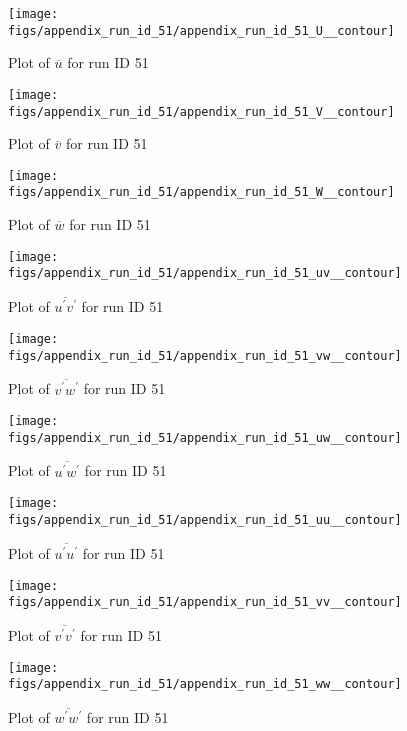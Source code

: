 \begin{figure}[H]
\centering
\texttt{[image: figs/appendix\_run\_id\_51/appendix\_run\_id\_51\_U\_\_contour]}
\caption{Plot of $\overline{u}$ for run ID 51}
\label{fig:appendix_run_id_51_U__contour}
\end{figure}


\begin{figure}[H]
\centering
\texttt{[image: figs/appendix\_run\_id\_51/appendix\_run\_id\_51\_V\_\_contour]}
\caption{Plot of $\overline{v}$ for run ID 51}
\label{fig:appendix_run_id_51_V__contour}
\end{figure}


\begin{figure}[H]
\centering
\texttt{[image: figs/appendix\_run\_id\_51/appendix\_run\_id\_51\_W\_\_contour]}
\caption{Plot of $\overline{w}$ for run ID 51}
\label{fig:appendix_run_id_51_W__contour}
\end{figure}


\begin{figure}[H]
\centering
\texttt{[image: figs/appendix\_run\_id\_51/appendix\_run\_id\_51\_uv\_\_contour]}
\caption{Plot of $\overline{u^\prime v^\prime}$ for run ID 51}
\label{fig:appendix_run_id_51_uv__contour}
\end{figure}


\begin{figure}[H]
\centering
\texttt{[image: figs/appendix\_run\_id\_51/appendix\_run\_id\_51\_vw\_\_contour]}
\caption{Plot of $\overline{v^\prime w^\prime}$ for run ID 51}
\label{fig:appendix_run_id_51_vw__contour}
\end{figure}


\begin{figure}[H]
\centering
\texttt{[image: figs/appendix\_run\_id\_51/appendix\_run\_id\_51\_uw\_\_contour]}
\caption{Plot of $\overline{u^\prime w^\prime}$ for run ID 51}
\label{fig:appendix_run_id_51_uw__contour}
\end{figure}


\begin{figure}[H]
\centering
\texttt{[image: figs/appendix\_run\_id\_51/appendix\_run\_id\_51\_uu\_\_contour]}
\caption{Plot of $\overline{u^\prime u^\prime}$ for run ID 51}
\label{fig:appendix_run_id_51_uu__contour}
\end{figure}


\begin{figure}[H]
\centering
\texttt{[image: figs/appendix\_run\_id\_51/appendix\_run\_id\_51\_vv\_\_contour]}
\caption{Plot of $\overline{v^\prime v^\prime}$ for run ID 51}
\label{fig:appendix_run_id_51_vv__contour}
\end{figure}


\begin{figure}[H]
\centering
\texttt{[image: figs/appendix\_run\_id\_51/appendix\_run\_id\_51\_ww\_\_contour]}
\caption{Plot of $\overline{w^\prime w^\prime}$ for run ID 51}
\label{fig:appendix_run_id_51_ww__contour}
\end{figure}


